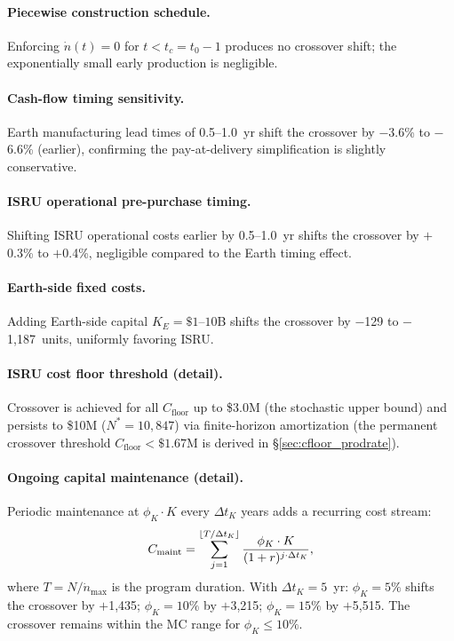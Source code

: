 \documentclass[5p,twocolumn]{elsarticle}
\begin{document}
\paragraph{Piecewise construction schedule.} Enforcing $\dot{n}(t) = 0$ for $t < t_c = t_0 - 1$ produces no crossover shift; the exponentially small early production is negligible.

\paragraph{Cash-flow timing sensitivity.} Earth manufacturing lead times of 0.5--1.0~yr shift the crossover by $-$3.6\% to $-$6.6\% (earlier), confirming the pay-at-delivery simplification is slightly conservative.

\paragraph{ISRU operational pre-purchase timing.} Shifting ISRU operational costs earlier by 0.5--1.0~yr shifts the crossover by $+$0.3\% to $+$0.4\%, negligible compared to the Earth timing effect.

\paragraph{Earth-side fixed costs.} Adding Earth-side capital $K_E = \$1$--$10$B shifts the crossover by $-$129 to $-$1{,}187~units, uniformly favoring ISRU.

\paragraph{ISRU cost floor threshold (detail).} Crossover is achieved for all $C_{\mathrm{floor}}$ up to \$3.0M (the stochastic upper bound) and persists to \$10M ($N^* = 10{,}847$) via finite-horizon amortization (the permanent crossover threshold $C_{\mathrm{floor}} < \$1.67$M is derived in \S\ref{sec:cfloor_prodrate}).

\paragraph{Ongoing capital maintenance (detail).} Periodic maintenance at $\phi_K \cdot K$ every $\Delta t_K$ years adds a recurring cost stream:
\begin{equation}\small
  C_{\mathrm{maint}} = \sum_{j=1}^{\lfloor T/\Delta t_K \rfloor} \frac{\phi_K \cdot K}{(1+r)^{j \cdot \Delta t_K}},
\end{equation}
where $T = N/\dot{n}_{\max}$ is the program duration. With $\Delta t_K = 5$~yr: $\phi_K = 5\%$ shifts the crossover by $+$1{,}435; $\phi_K = 10\%$ by $+$3{,}215; $\phi_K = 15\%$ by $+$5{,}515. The crossover remains within the MC range for $\phi_K \leq 10\%$.
\end{document}
